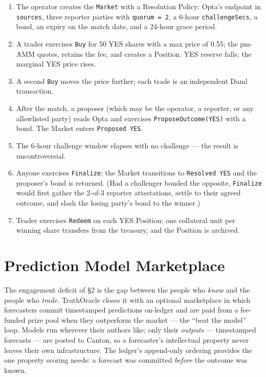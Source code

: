 \documentclass[11pt,a4paper]{article}
\begin{document}
\begin{sloppypar}
\begin{enumerate}[leftmargin=2em, itemsep=3pt]
\item The operator creates the \texttt{Market} with a Resolution Policy: Opta's endpoint in \texttt{sources}, three reporter parties with \texttt{quorum = 2}, a 6-hour \texttt{challengeSecs}, a bond, an expiry on the match date, and a 24-hour grace period.
\item A trader exercises \texttt{Buy} for 50 YES shares with a max price of 0.55; the pm-AMM quotes, retains the fee, and creates a Position. YES reserve falls; the marginal YES price rises.
\item A second \texttt{Buy} moves the price further; each trade is an independent Daml transaction.
\item After the match, a proposer (which may be the operator, a reporter, or any allowlisted party) reads Opta and exercises \texttt{ProposeOutcome(YES)} with a bond. The Market enters \texttt{Proposed YES}.
\item The 6-hour challenge window elapses with no challenge --- the result is uncontroversial.
\item Anyone exercises \texttt{Finalize}; the Market transitions to \texttt{Resolved YES} and the proposer's bond is returned. (Had a challenger bonded the opposite, \texttt{Finalize} would first gather the 2-of-3 reporter attestations, settle to their agreed outcome, and slash the losing party's bond to the winner.)
\item Trader exercises \texttt{Redeem} on each YES Position; one collateral unit per winning share transfers from the treasury, and the Position is archived.
\end{enumerate}
\end{sloppypar}

\section{Prediction Model Marketplace}
\label{sec:models}

The engagement deficit of \S2 is the gap between the people who \emph{know} and the people who \emph{trade}. TruthOracle closes it with an optional marketplace in which forecasters commit timestamped predictions on-ledger and are paid from a fee-funded prize pool when they outperform the market --- the ``beat the model'' loop. Models run wherever their authors like; only their \emph{outputs} --- timestamped forecasts --- are posted to Canton, so a forecaster's intellectual property never leaves their own infrastructure. The ledger's append-only ordering provides the one property scoring needs: a forecast was committed \emph{before} the outcome was known.
\end{document}
